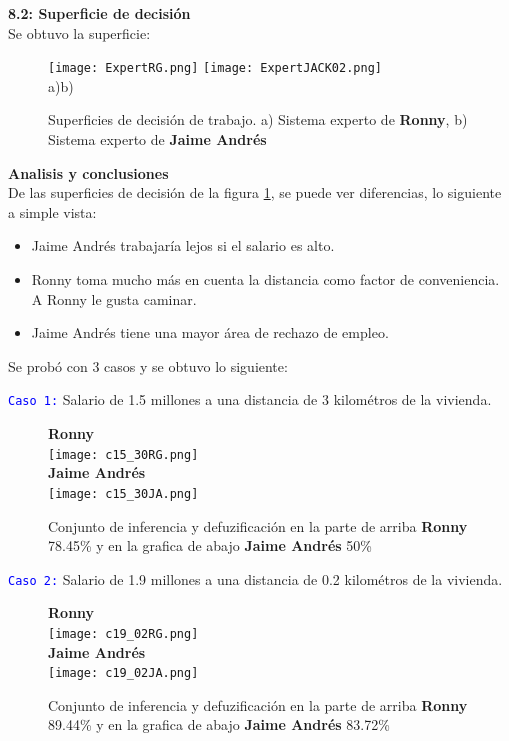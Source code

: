\documentclass[10pt,onecolumn,twoside,letterpaper]{article}
\begin{document}
\par{\bf 8.2: Superficie de decisi\'on}\\
Se obtuvo la superficie:
\begin{figure}[H]
  \centering
  \texttt{[image: ExpertRG.png]}
  \texttt{[image: ExpertJACK02.png]}\\
  a)\hspace{8cm}b)
  \caption{Superficies de decisi\'on de trabajo. a) Sistema experto de \textbf{Ronny}, b) Sistema experto de \textbf{Jaime Andr\'es}}
  \label{fig:SurfDecision}
\end{figure}
\par{\bf Analisis y conclusiones}\\
De las superficies de decisi\'on de la figura \ref{fig:SurfDecision}, se puede ver diferencias, lo siguiente a simple vista:
\begin{itemize}
\item Jaime Andr\'es trabajar\'ia lejos si el salario es alto. 
\item Ronny toma mucho m\'as en cuenta la distancia como factor de conveniencia. A Ronny le gusta caminar.
\item Jaime Andr\'es tiene una mayor \'area de rechazo de empleo.
\end{itemize}
Se prob\'o con 3 casos y se obtuvo lo siguiente:
\par \textcolor{blue}{\texttt{Caso 1:}} Salario de 1.5 millones a una distancia de 3 kilom\'etros de la vivienda. 
\begin{figure}[H]
  \centering
  \textbf{Ronny}\\
  \texttt{[image: c15\_30RG.png]}\\
  \textbf{Jaime Andr\'es}\\
  \texttt{[image: c15\_30JA.png]}\\
  \caption{\small Conjunto de inferencia y defuzificaci\'on en la parte de arriba \textbf{Ronny} 78.45\% y en la grafica de abajo \textbf{Jaime Andr\'es} 50\%}
  \label{fig:UnivC}
\end{figure}
\par \textcolor{blue}{\texttt{Caso 2:}} Salario de 1.9 millones a una distancia de 0.2 kilom\'etros de la vivienda. 
\begin{figure}[H]
  \centering
  \textbf{Ronny}\\
  \texttt{[image: c19\_02RG.png]}\\
  \textbf{Jaime Andr\'es}\\
  \texttt{[image: c19\_02JA.png]}\\
  \caption{\small Conjunto de inferencia y defuzificaci\'on en la parte de arriba \textbf{Ronny} 89.44\% y en la grafica de abajo \textbf{Jaime Andr\'es} 83.72\%}
  \label{fig:UnivC}
\end{figure}
\end{document}
